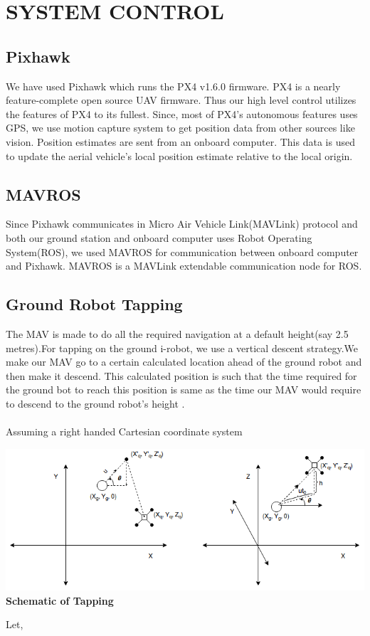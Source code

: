 \documentclass[12pt]{article}
\begin{document}
\section{SYSTEM CONTROL}
\subsection{Pixhawk}
    We have used Pixhawk which runs the PX4 v1.6.0 firmware. PX4 is a nearly feature-complete open source UAV firmware. Thus our high level control utilizes the features of PX4 to its fullest. Since, most of PX4’s autonomous features uses GPS, we use motion capture system to get position data from other sources like vision. Position estimates are sent from an onboard computer. This data is used to update the aerial vehicle's local position estimate relative to the local origin.  
\subsection{MAVROS}
    Since Pixhawk communicates in Micro Air Vehicle Link(MAVLink) protocol and both our ground station and onboard computer uses Robot Operating System(ROS), we used MAVROS for communication between onboard computer and Pixhawk. MAVROS is a MAVLink extendable communication node for ROS.
\subsection{Ground Robot Tapping}
    The MAV is made to do all the required navigation at a default height(say 2.5 metres).For tapping on the ground i-robot, we use a vertical descent strategy.We make our MAV go to a certain calculated location ahead of the ground robot and then make it descend. This calculated position is such that the time required for the ground bot to reach this position is same as the time our MAV would require to descend to the ground robot's height .\\
\\ Assuming a right handed Cartesian coordinate system \\
\begin{center}
\includegraphics[scale=0.5]{tap}\\
\textbf{Schematic of Tapping}
\end{center}
Let,
    
\end{document}
